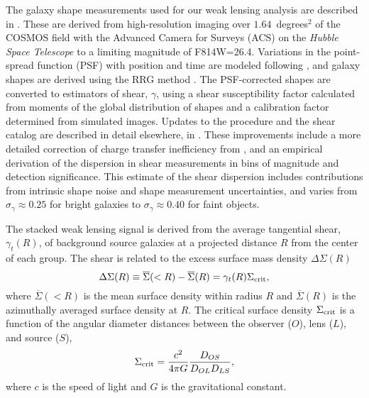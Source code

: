 The galaxy shape measurements used for our weak lensing analysis are
described in \citet{Leauthaud2007}. These are derived from
high-resolution imaging over $1.64$~degrees$^2$ of the COSMOS field
with the Advanced Camera for Surveys (ACS) on the \textit{Hubble Space
  Telescope} \citep[\textit{HST};][]{Koekemoer2007} to a limiting magnitude of
F814W=26.4.  Variations in the point-spread function (PSF) with
position and time are modeled following \citet{Rhodes2007}, and galaxy
shapes are derived using the RRG method \citep{Rhodes2000}. The
PSF-corrected shapes are converted to estimators of shear, $\gamma$,
using a shear susceptibility factor calculated from moments of the
global distribution of shapes and a calibration factor determined from
simulated images. Updates to the procedure and the shear catalog are
described in detail elsewhere, in \citet{Leauthaud2012}. These improvements include a more
detailed correction of charge transfer inefficiency from
\citet{Massey2010}, and an empirical derivation of the dispersion in
shear measurements in bins of magnitude and detection
significance. This estimate of the shear dispersion includes
contributions from intrinsic shape noise and shape measurement
uncertainties, and varies from $\sigma_{\gamma}\approx 0.25$ for
bright galaxies to $\sigma_{\gamma}\approx 0.40$ for faint objects.

The stacked weak lensing signal is derived from the average
tangential shear, $\gamma_t(R)$, of background source galaxies at a
projected distance $R$ from the center of each group. The shear is related to
the excess surface mass density $\Delta\Sigma(R)$ \citep{Miralda1991}
\begin{equation}
\Delta\Sigma(R) \equiv \overline{\Sigma}(<R) - \overline{\Sigma}(R) =
\gamma_t(R)\Sigma_{\rm crit},
\label{cen_eq:ds_def}
\end{equation}
where $\overline{\Sigma}(<R)$ is the mean surface density within
radius $R$ and $\overline{\Sigma}(R)$ is the azimuthally averaged
surface density at $R$. The critical surface density $\Sigma_{\rm
  crit}$ is a function of the angular diameter distances between the
observer ($O$), lens ($L$), and source ($S$),
\begin{equation}
\Sigma_{\rm crit}=\frac{c^2}{4\pi G}\frac{D_{OS}}{D_{OL}D_{LS}},
\label{cen_eq:sigma_crit}
\end{equation}
where $c$ is the speed of light and $G$ is the gravitational constant.

